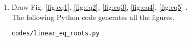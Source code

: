 \renewcommand{\theequation}{\theenumi}
\begin{enumerate}[label=\thesection.\arabic*.,ref=\thesection.\theenumi]

\item Draw Fig. \ref{fig:eq1}, \ref{fig:eq2}, \ref{fig:eq3}, \ref{fig:eq4}, \ref{fig:eq5} .\\

\solution The  following Python code generates all the figures.
\begin{lstlisting}
codes/linear_eq_roots.py
\end{lstlisting}

\pagebreak
\end{enumerate}
